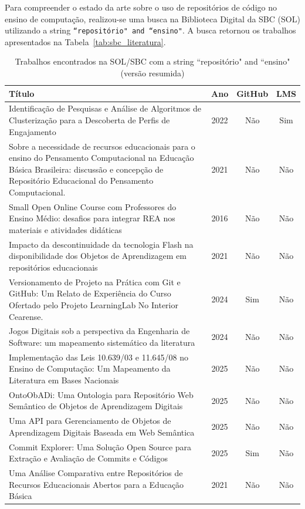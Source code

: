 \documentclass[english, spanish, brazilian]{RBIEarticle}
\begin{document}
	Para compreender o estado da arte sobre o uso de repositórios de código no ensino de computação, realizou-se uma busca na Biblioteca Digital da SBC (SOL) utilizando a string \texttt{``repositório" and ``ensino"}. A busca retornou os trabalhos apresentados na Tabela~\ref{tab:sbc_literatura}.

	\begin{table}[!htb]
		\centering
		\small
		\caption{Trabalhos encontrados na SOL/SBC com a string ``repositório" and ``ensino" (versão resumida)}
		\label{tab:sbc_literatura_resumo}
		\begin{tabular}{p{12cm} c c c}
			\toprule
			\textbf{Título} & \textbf{Ano} & \textbf{GitHub} & \textbf{LMS} \\
			\midrule
			Identificação de Pesquisas  e Análise de Algoritmos de Clusterização para a Descoberta de Perfis de Engajamento & 2022 & Não & Sim \\
			Sobre a necessidade de recursos educacionais para o ensino do Pensamento Computacional na Educação Básica Brasileira: discussão e concepção de Repositório Educacional do Pensamento Computacional. & 2021 & Não & Não \\
			Small Open Online Course  com Professores do Ensino Médio: desafios para integrar REA nos materiais e atividades didáticas & 2016 & Não & Não \\
			Impacto da descontinuidade da  tecnologia Flash na disponibilidade dos Objetos de Aprendizagem em  repositórios educacionais & 2021 & Não & Não \\
			Versionamento de Projeto na Prática com Git e GitHub: Um Relato de Experiência do Curso Ofertado pelo Projeto LearningLab No Interior Cearense. & 2024 & Sim & Não \\
			Jogos Digitais sob a perspectiva da Engenharia de Software: um mapeamento sistemático da literatura & 2024 & Não & Não \\
			Implementação das Leis 10.639/03 e 11.645/08 no Ensino de Computação: Um Mapeamento da Literatura em Bases Nacionais & 2025 & Não & Não \\
			OntoObADi: Uma Ontologia para Repositório Web Semântico de Objetos de Aprendizagem Digitais & 2025 & Não & Não \\
			Uma API para Gerenciamento de Objetos de Aprendizagem Digitais Baseada em Web Semântica & 2025 & Não & Não \\
			Commit Explorer: Uma Solução Open Source para Extração e Avaliação de Commits e Códigos
			 & 2025 & Sim & Não \\
			Uma Análise Comparativa entre Repositórios de Recursos Educacionais Abertos para a Educação Básica & 2021 & Não & Não \\
			\bottomrule
		\end{tabular}
	\end{table}
	
\end{document}
